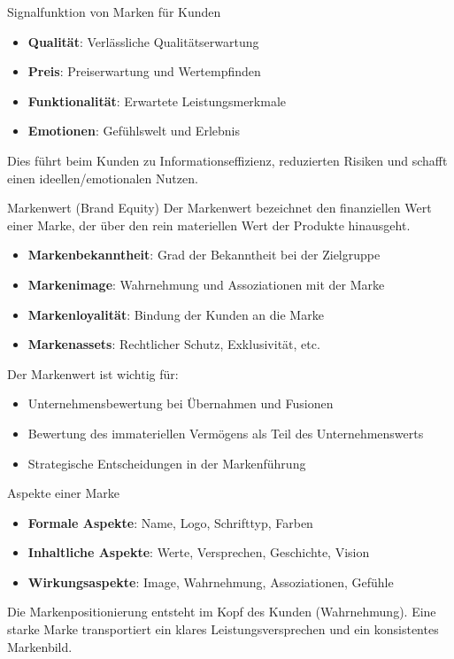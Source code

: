

\begin{definition}{Signalfunktion von Marken} für Kunden
\begin{itemize}
    \item \textbf{Qualität}: Verlässliche Qualitätserwartung
    \item \textbf{Preis}: Preiserwartung und Wertempfinden
    \item \textbf{Funktionalität}: Erwartete Leistungsmerkmale
    \item \textbf{Emotionen}: Gefühlswelt und Erlebnis
\end{itemize}

Dies führt beim Kunden zu Informationseffizienz, reduzierten Risiken und schafft einen ideellen/emotionalen Nutzen.
\end{definition}


\begin{concept}{Markenwert (Brand Equity)}
Der Markenwert bezeichnet den finanziellen Wert einer Marke, der über den rein materiellen Wert der Produkte hinausgeht.
\begin{itemize}
    \item \textbf{Markenbekanntheit}: Grad der Bekanntheit bei der Zielgruppe
    \item \textbf{Markenimage}: Wahrnehmung und Assoziationen mit der Marke
    \item \textbf{Markenloyalität}: Bindung der Kunden an die Marke
    \item \textbf{Markenassets}: Rechtlicher Schutz, Exklusivität, etc.
\end{itemize}

Der Markenwert ist wichtig für:
\begin{itemize}
    \item Unternehmensbewertung bei Übernahmen und Fusionen
    \item Bewertung des immateriellen Vermögens als Teil des Unternehmenswerts
    \item Strategische Entscheidungen in der Markenführung
\end{itemize}
\end{concept}

\begin{concept}{Aspekte einer Marke}
\begin{itemize}
    \item \textbf{Formale Aspekte}: Name, Logo, Schrifttyp, Farben
    \item \textbf{Inhaltliche Aspekte}: Werte, Versprechen, Geschichte, Vision
    \item \textbf{Wirkungsaspekte}: Image, Wahrnehmung, Assoziationen, Gefühle
\end{itemize}

Die Markenpositionierung entsteht im Kopf des Kunden (Wahrnehmung). Eine starke Marke transportiert ein klares Leistungsversprechen und ein konsistentes Markenbild.
\end{concept}


